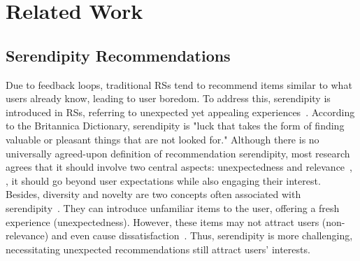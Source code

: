 \section{Related Work}
\subsection{Serendipity Recommendations}

Due to feedback loops, traditional RSs tend to recommend items similar to what users already know, leading to user boredom. To address this, serendipity is introduced in RSs, referring to unexpected yet appealing experiences~\cite{fu2023deep,ziarani2021serendipity,kotkov2016survey}. According to the Britannica Dictionary, serendipity is "luck that takes the form of finding valuable or pleasant things that are not looked for." Although there is no universally agreed-upon definition of recommendation serendipity, most research agrees that it should involve two central aspects: unexpectedness and relevance~\cite{fu2024art,fu2023deep,fu2023wisdom}, \ie, 
it should go beyond user expectations while also engaging their interest. 
Besides, diversity and novelty are two concepts often associated with serendipity~\cite{fu2023deep,kotkov2016survey,kaminskas2016diversity}. They can introduce unfamiliar items to the user, offering a fresh experience (unexpectedness). However, these items may not attract users (non-relevance) and even cause dissatisfaction~\cite{kotkov2016survey}. Thus, serendipity is more challenging, necessitating unexpected recommendations still attract users' interests.


